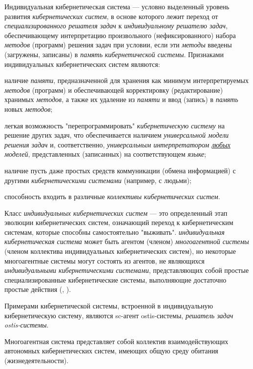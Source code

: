 Индивидуальная кибернетическая система — условно выделенный уровень развития \textit{кибернетических систем}, в основе которого лежит переход от \textit{специализированного решателя задач} к \textit{индивидуальному решателю задач}, обеспечивающему интерпретацию произвольного (нефиксированного) набора \textit{методов} (программ) решения задач при условии, если эти \textit{методы} введены (загружены, записаны) в \textit{память} \textit{кибернетической системы}.
Признаками индивидуальных кибернетических систем являются:
\begin{textitemize}
    \item наличие \textit{памяти}, предназначенной для хранения как минимум интерпретируемых \textit{методов}	(программ)  и обеспечивающей корректировку (редактирование) хранимых \textit{методов}, а также их удаление из	\textit{памяти} и ввод (запись) в \textit{память} новых \textit{методов};
    \item легкая возможность "перепрограммировать"{} \textit{кибернетическую систему} на решение других задач, что обеспечивается наличием \textit{универсальной модели решения задач} и, соответственно, \textit{универсальным интерпретатором \uline{любых} моделей}, представленных (записанных) на соответствующем \textit{языке};
    \item наличие пусть даже простых средств коммуникации (обмена информацией) с другими \textit{кибернетическими системами} (например, с людьми);
    \item способность входить в различные \textit{коллективы кибернетических систем}.
\end{textitemize}

Класс \textit{индивидуальных кибернетических систем} — это определенный этап эволюции кибернетических систем, означающий переход к кибернетическим системам, которые способны самостоятельно "выживать". \textit{индивидуальная кибернетическая система} может быть агентом (членом) \textit{многоагентной системы} (членом коллектива индивидуальных кибернетических систем), но некоторые многоагентные системы могут состоять из агентов, не являющихся \textit{индивидуальными кибернетическими системами}, представляющих собой простые специализированные кибернетические системы, выполняющие достаточно простые действия (, ).

Примерами кибернетической системы, встроенной в индивидуальную кибернетическую систему, являются sc-агент ostis-системы, \textit{решатель задач ostis-системы}.

Многоагентная система представляет собой коллектив взаимодействующих автономных кибернетических систем, имеющих общую среду обитания (жизнедеятельности). 


